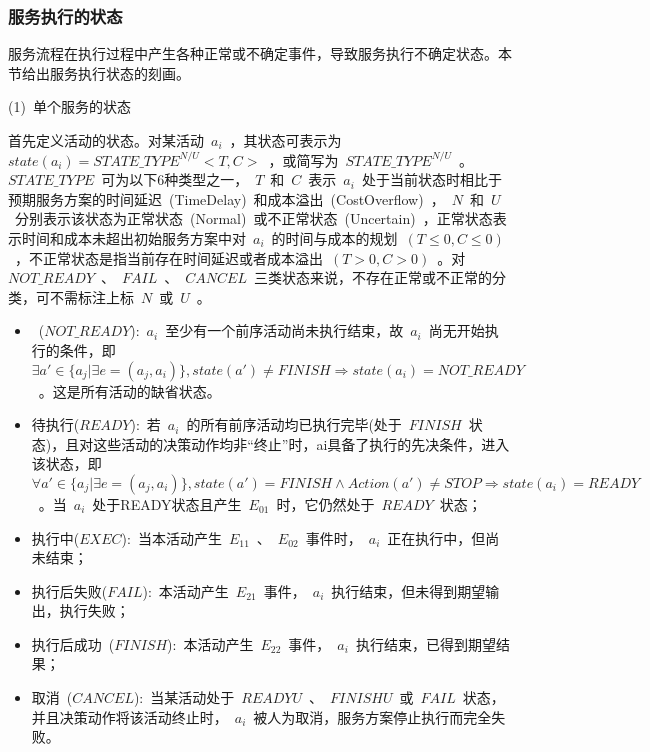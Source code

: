\subsubsection{服务执行的状态}

服务流程在执行过程中产生各种正常或不确定事件，导致服务执行不确定状态。本节给出服务执行状态的刻画。

(1)~单个服务的状态

首先定义活动的状态。对某活动~$a_i$~，其状态可表示为~$state(a_i)=STATE\_TYPE^{N/U}<T, C>$~，或简写为~$STATE\_TYPE^{N/U}$~。~$STATE\_TYPE$~可为以下6种类型之一，~$T$~和~$C$~表示~$a_i$~处于当前状态时相比于预期服务方案的时间延迟~(TimeDelay)~和成本溢出~(CostOverflow)~，~$N$~和~$U$~分别表示该状态为正常状态~(Normal)~或不正常状态~(Uncertain)~，正常状态表示时间和成本未超出初始服务方案中对~$a_i$~的时间与成本的规划~$(T\le 0, C\le 0)$~，不正常状态是指当前存在时间延迟或者成本溢出~$(T>0, C>0)$~。对~$NOT\_READY$~、~$FAIL$~、~$CANCEL$~三类状态来说，不存在正常或不正常的分类，可不需标注上标~$N$~或~$U$~。

\begin{itemize}

\item ~($NOT\_READY$):~$a_i$~至少有一个前序活动尚未执行结束，故~$a_i$~尚无开始执行的条件，即~$\exists a' \in \{ {a_j}|\exists e = ( {{a_j},{a_i}} )\} ,state ( {a'} ) \ne FINISH \Rightarrow state ( {{a_i}} ) = NOT\_READY$~。这是所有活动的缺省状态。

\item 待执行($READY$):~若~$a_i$~的所有前序活动均已执行完毕(处于~$FINISH$~状态)，且对这些活动的决策动作均非“终止”时，ai具备了执行的先决条件，进入该状态，即~$\forall a' \in \{ {a_j}|\exists e = ( {{a_j},{a_i}} )\} ,state ( {a'} ) = FINISH \wedge Action(a') \ne STOP \Rightarrow state ( {{a_i}} ) = READY$~。当~$a_i$~处于READY状态且产生~$E_{01}$~时，它仍然处于~$READY$~状态；

\item 执行中($EXEC$):~当本活动产生~$E_{11}$~、~$E_{02}$~事件时，~$a_i$~正在执行中，但尚未结束；

\item 执行后失败($FAIL$):~本活动产生~$E_{21}$~事件，~$a_i$~执行结束，但未得到期望输出，执行失败；

\item 执行后成功~($FINISH$):~本活动产生~$E_{22}$~事件，~$a_i$~执行结束，已得到期望结果；

\item 取消~($CANCEL$):~当某活动处于~$READYU$~、~$FINISHU$~或~$FAIL$~状态，并且决策动作将该活动终止时，~$a_i$~被人为取消，服务方案停止执行而完全失败。
\end{itemize}

